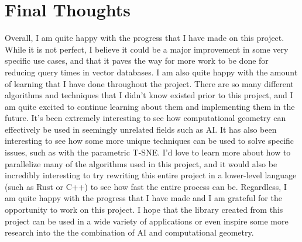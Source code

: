 \documentclass{article}
\begin{document}
\section{Final Thoughts}
Overall, I am quite happy with the progress that I have made on this project. While it is not
perfect, I believe it could be a major improvement in some very specific use cases, and that it paves the way for more work to be done for reducing query times in vector databases. I am also
quite happy with the amount of learning that I have done throughout the project. There are so
many different algorithms and techniques that I didn't know existed prior to this project, and
I am quite excited to continue learning about them and implementing them in the future. It's been extremely interesting to see how computational geometry
can effectively be used in seemingly unrelated fields such as AI.
It has also been interesting to see how some more unique techniques can be used to solve specific issues, such as with the parametric T-SNE. 
I'd love to learn more about how to parallelize many of the algorithms
used in this project, and it would also be incredibly interesting to try rewriting this entire project
in a lower-level language (such as Rust or C++) to see how fast the entire process can be.
Regardless, I am quite happy with the progress that I have made and I am grateful for the opportunity to work on this project.
I hope that the library created from this project can be used in a wide variety of applications or even inspire some more research into the the combination of AI and computational geometry.

\newpage
{}


\end{document}
